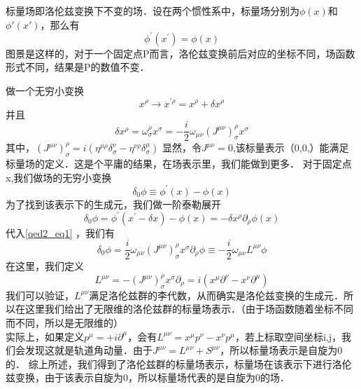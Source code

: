
\begin{definition}{}
标量场即洛伦兹变换下不变的场．设在两个惯性系中，标量场分别为$\phi(x)$和$\phi'(x')$，那么有
\begin{equation}
\phi^{\prime}\left(x^{\prime}\right)=\phi(x)
\end{equation}
图景是这样的，对于一个固定点P而言，洛伦兹变换前后对应的坐标不同，场函数形式不同，结果是P的数值不变．
\end{definition}
\begin{corollary}{}
做一个无穷小变换
\begin{equation}
x^{\rho} \rightarrow x^{\prime \rho}=x^{\rho}+\delta x^{\rho}
\end{equation}
并且
\begin{equation}\label{qed2_eq1}
\delta x^{\rho}=\omega_{\sigma}^{\rho} x^{\sigma}=-\frac{i}{2} \omega_{\mu \nu}\left(J^{\mu \nu}\right)_{\sigma}^{\rho} x^{\sigma}
\end{equation}
其中，$\left(J^{\mu \nu}\right)_{\sigma}^{\rho}=i\left(\eta^{\mu \rho} \delta_{\sigma}^{\nu}-\eta^{\nu \rho} \delta_{\sigma}^{\mu}\right)$
显然，令$J^{\mu \nu}=0$,该标量表示（0,0,）能满足标量场的定义．这是个平庸的结果，在场表示里，我们能做到更多．
对于固定点x,我们做场的无穷小变换
\begin{equation}
\delta_{0} \phi \equiv \phi^{\prime}(x)-\phi(x)
\end{equation}
为了找到该表示下的生成元，我们做一阶泰勒展开
\begin{equation}
\delta_{0} \phi=\phi^{\prime}\left(x^{\prime}-\delta x\right)-\phi(x)=-\delta x^{\rho} \partial_{\rho} \phi(x)
\end{equation}
代入\autoref{qed2_eq1} ，我们有
\begin{equation}
\delta_{0} \phi=\frac{i}{2} \omega_{\mu \nu}\left(J^{\mu \nu}\right)_{\sigma}^{\rho} x^{\sigma} \partial_{\rho} \phi \equiv-\frac{i}{2} \omega_{\mu \nu} L^{\mu \nu} \phi
\end{equation}
在这里，我们定义
\begin{equation}
L^{\mu \nu}=-\left(J^{\mu \nu}\right)_{\sigma}^{\rho} x^{\sigma} \partial_{\rho}=i\left(x^{\mu} \partial^{\nu}-x^{\nu} \partial^{\mu}\right)
\end{equation}
我们可以验证，$L^{\mu \nu}$满足洛伦兹群的李代数，从而确实是洛伦兹变换的生成元．所以在这里我们给出了无限维的洛伦兹群的标量场表示．（由于场函数随着坐标不同而不同，所以是无限维的）\\
实际上，如果定义$p^{\mu}=+i \partial^{\mu}$，会有$L^{\mu \nu}=x^{\mu} p^{\nu}-x^{\nu} p^{\mu}$，若上标取空间坐标i,j，我们会发现这就是轨道角动量．由于$J^{\mu \nu}=L^{\mu \nu}+S^{\mu \nu}$，所以标量场表示是自旋为0的．
综上所述，我们得到了洛伦兹群的标量场表示，标量场在该表示下进行洛伦兹变换，由于该表示自旋为0，所以标量场代表的是自旋为0的场．
\end{corollary}

